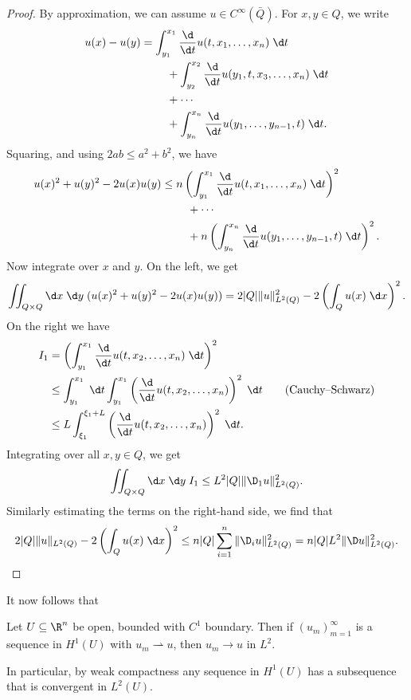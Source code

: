 \documentclass[a4paper]{article}
\begin{document}
\begin{proof}
  By approximation, we can assume $u \in C^\infty(\bar{Q})$. For $x,y \in Q$, we write
  \begin{align*}
    u(x) - u(y) &= \int_{y_1}^{x_1} \frac{\d}{\d t} u(t, x_1, \ldots, x_n)\;\d t\\
    &\hphantom{{}={}}\quad + \int_{y_2}^{x_2} \frac{\d}{\d t} u(y_1, t, x_3, \ldots, x_n)\;\d t\\
    &\hphantom{{}={}}\quad + \cdots\\
    &\hphantom{{}={}}\quad + \int_{y_n}^{x_n} \frac{\d}{\d t} u(y_1, \ldots, y_{n - 1}, t)\;\d t.
  \end{align*}
  Squaring, and using $2ab \leq a^2 + b^2$, we have
  \begin{align*}
    u(x)^2 + u(y)^2 - 2u(x) u(y) &\leq n\left(\int_{y_1}^{x_1} \frac{\d}{\d t} u(t, x_1, \ldots, x_n)\;\d t\right)^2\\
    &\hphantom{{}={}} \quad+ \cdots\\
    &\hphantom{{}={}} \quad+ n\left(\int_{y_n}^{x_n} \frac{\d}{\d t} u(y_1, \ldots, y_{n - 1}, t)\;\d t\right)^2.
  \end{align*}
  Now integrate over $x$ and $y$. On the left, we get
  \[
    \iint_{Q \times Q}\d x\;\d y\; (u(x)^2 + u(y)^2 - 2u(x) u(y)) = 2 |Q| \|u\|_{L^2(Q)}^2 - 2 \left(\int_Q u(x) \;\d x\right)^2.
  \]
  On the right we have
  \begin{align*}
    I_1 &= \left(\int_{y_1}^{x_1} \frac{\d}{\d t} u(t, x_2, \ldots, x_n) \;\d t\right)^2\\
    &\leq \int_{y_1}^{x_1} \;\d t \int_{y_1}^{x_1}\left(\frac{\d}{\d t} u(t, x_2, \ldots, x_n)\right)^2 \;\d t\tag{Cauchy--Schwarz}\\
    &\leq L \int_{\xi_1}^{\xi_1 + L} \left(\frac{\d}{\d t} u(t, x_2, \ldots, x_n)\right)^2 \;\d t.
  \end{align*}
  Integrating over all $x, y \in Q$, we get
  \[
    \iint_{Q \times Q}\d x\;\d y\; I_1 \leq L^2 |Q| \|\D_1 u\|_{L^2(Q)}^2.
  \]
  Similarly estimating the terms on the right-hand side, we find that
  \[
    2|Q| \|u\|_{L^2(Q)} - 2 \left(\int_Q u(x)\;\d x\right)^2 \leq n |Q| \sum_{i = 1}^n \|\D _i u\|^2_{L^2(Q)} = n |Q| L^2 \|\D u\|^2_{L^2(Q)}.\qedhere
  \]
\end{proof}
It now follows that
\begin{thm}
  Let $U \subseteq \R^n$ be open, bounded with $C^1$ boundary. Then if $(u_m)_{m = 1}^\infty$ is a sequence in $H^1(U)$ with $u_m \rightharpoonup u$, then $u_m \to u$ in $L^2$.

  In particular, by weak compactness any sequence in $H^1(U)$ has a subsequence that is convergent in $L^2(U)$.
\end{thm}
\end{document}
